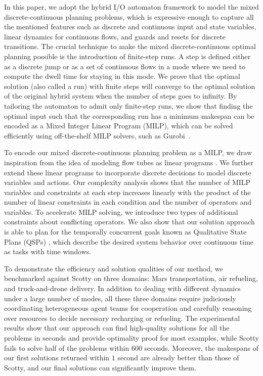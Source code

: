 \documentclass[sigconf]{acmart}
\begin{document}
In this paper, we adopt the hybrid I/O automaton \cite{lynch1995hybrid} framework to model the mixed discrete-continuous planning problems, which is expressive enough to capture all the mentioned features such as discrete and continuous input and state variables, linear dynamics for continuous flows, and guards and resets for discrete transitions. The crucial technique to make the mixed discrete-continuous optimal planning possible is the introduction of finite-step runs. A step is defined either as a discrete jump or as a set of continuous flows in a mode where we need to compute the dwell time for staying in this mode. We prove that the optimal solution (also called a run) with finite steps will converge to the optimal solution of the original hybrid system when the number of steps goes to infinity. By tailoring the automaton to admit only finite-step runs, we show that finding the optimal input such that the corresponding run has a minimum makespan can be encoded as a Mixed Integer Linear Program (MILP), which can be solved efficiently using off-the-shelf MILP solvers, such as Gurobi~\cite{gurobi2020gurobi}.    


To encode our mixed discrete-continuous planning problem as a MILP, we draw inspiration from the idea of modeling flow tubes \cite{hofmann2006robust} as linear programs \cite{fernandez2018scottyactivity}. We further extend these linear programs to incorporate discrete decisions to model discrete variables and actions. Our complexity analysis shows that the number of MILP variables and constraints at each step increases linearly with the product of the number of linear constraints in each condition and the number of operators and variables. To accelerate MILP solving, we introduce two types of additional constraints about conflicting operators. We also show that our solution approach is able to plan for the temporally concurrent goals known as Qualitative State Plans (QSPs) \cite{hoffmann2001ff}, which describe the desired system behavior over continuous time as tasks with time windows. 


To demonstrate the efficiency and solution qualities of our method, we benchmarked against Scotty \cite{fernandez2018scottyactivity} on three domains: Mars transportation, air refueling, and truck-and-drone delivery. In addition to dealing with different dynamics under a large number of modes, all these three domains require judiciously coordinating heterogeneous agent teams for cooperation and carefully reasoning over resources to decide necessary recharging or refueling.  The experimental results show that our approach can find high-quality solutions for all the problems in seconds and provide optimality proof for most examples, while Scotty fails to solve half of the problems within 600 seconds. Moreover, the makespans of our first solutions returned within $1$ second are already better than those of Scotty, and our final solutions can significantly improve them.
\end{document}
